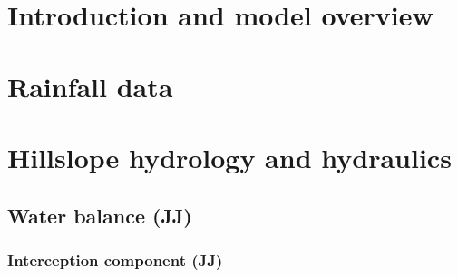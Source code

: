

\section{Introduction and model overview}



\section{Rainfall data}

\section{Hillslope hydrology and hydraulics}

    \subsection{Water balance (JJ)}


        \subsubsection{Interception component (JJ)}
